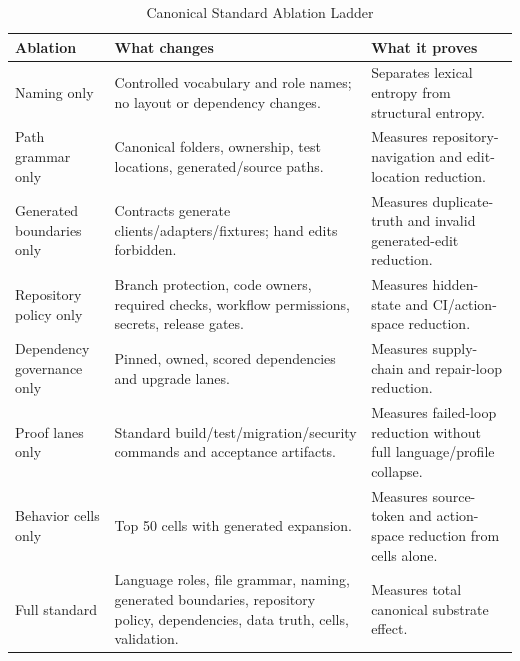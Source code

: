 \begin{table}[t]
\caption{Canonical Standard Ablation Ladder}
\label{tab:ablation}
\centering
\footnotesize
\begin{tabularx}{\textwidth}{p{}X X}
\toprule
Ablation & What changes & What it proves \\
\midrule
Naming only & Controlled vocabulary and role names; no layout or dependency changes. & Separates lexical entropy from structural entropy. \\
Path grammar only & Canonical folders, ownership, test locations, generated/source paths. & Measures repository-navigation and edit-location reduction. \\
Generated boundaries only & Contracts generate clients/adapters/fixtures; hand edits forbidden. & Measures duplicate-truth and invalid generated-edit reduction. \\
Repository policy only & Branch protection, code owners, required checks, workflow permissions, secrets, release gates. & Measures hidden-state and CI/action-space reduction. \\
Dependency governance only & Pinned, owned, scored dependencies and upgrade lanes. & Measures supply-chain and repair-loop reduction. \\
Proof lanes only & Standard build/test/migration/security commands and acceptance artifacts. & Measures failed-loop reduction without full language/profile collapse. \\
Behavior cells only & Top 50 cells with generated expansion. & Measures source-token and action-space reduction from cells alone. \\
Full standard & Language roles, file grammar, naming, generated boundaries, repository policy, dependencies, data truth, cells, validation. & Measures total canonical substrate effect. \\
\bottomrule
\end{tabularx}
\end{table}


